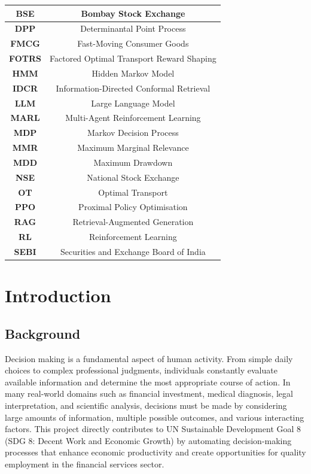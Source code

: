 \documentclass[12pt,a4paper,oneside]{report}
\theoremstyle{definition}
\theoremstyle{remark}
\begin{document}
\vspace{1cm}
\begin{center}
\begin{tabular}{|c|c|}
\hline
\textbf{BSE} & Bombay Stock Exchange \\
\hline
\textbf{DPP} & Determinantal Point Process \\
\hline
\textbf{FMCG} & Fast-Moving Consumer Goods \\
\hline
\textbf{FOTRS} & Factored Optimal Transport Reward Shaping \\
\hline
\textbf{HMM} & Hidden Markov Model \\
\hline
\textbf{IDCR} & Information-Directed Conformal Retrieval \\
\hline
\textbf{LLM} & Large Language Model \\
\hline
\textbf{MARL} & Multi-Agent Reinforcement Learning \\
\hline
\textbf{MDP} & Markov Decision Process \\
\hline
\textbf{MMR} & Maximum Marginal Relevance \\
\hline
\textbf{MDD} & Maximum Drawdown \\
\hline
\textbf{NSE} & National Stock Exchange \\
\hline
\textbf{OT} & Optimal Transport \\
\hline
\textbf{PPO} & Proximal Policy Optimisation \\
\hline
\textbf{RAG} & Retrieval-Augmented Generation \\
\hline
\textbf{RL} & Reinforcement Learning \\
\hline
\textbf{SEBI} & Securities and Exchange Board of India \\
\hline
\end{tabular}
\end{center}


\clearpage
\cleardoublepage
\pagestyle{fancy}
\setcounter{page}{1}

\chapter{Introduction}

\section{Background}

Decision making is a fundamental aspect of human activity. From simple daily choices to complex professional judgments, individuals constantly evaluate available information and determine the most appropriate course of action. In many real-world domains such as financial investment, medical diagnosis, legal interpretation, and scientific analysis, decisions must be made by considering large amounts of information, multiple possible outcomes, and various interacting factors. This project directly contributes to UN Sustainable Development Goal 8 (SDG 8: Decent Work and Economic Growth) by automating decision-making processes that enhance economic productivity and create opportunities for quality employment in the financial services sector.
\end{document}

